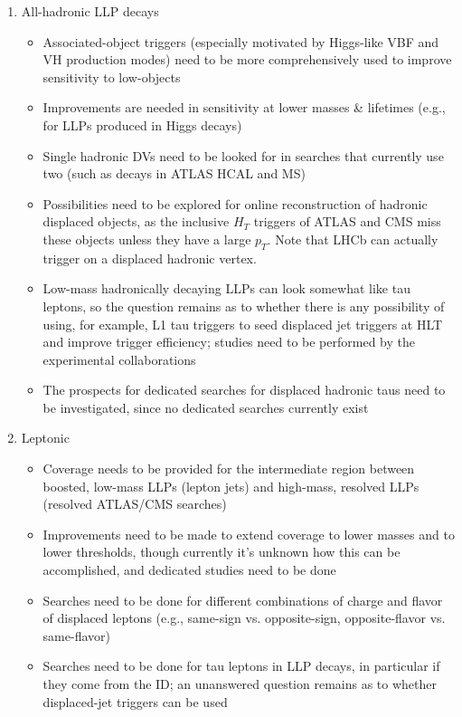 {\begin{enumerate}
\item All-hadronic LLP decays
	\begin{itemize}
	\item Associated-object triggers (especially motivated by Higgs-like VBF and VH production modes) need to be more comprehensively used to improve sensitivity to low-\pT objects
	\item Improvements are needed in sensitivity at lower masses \& lifetimes (e.g., for LLPs produced in Higgs decays)
	\item Single hadronic DVs need to be looked for in searches that currently use two (such as decays in ATLAS HCAL and MS)
	\item Possibilities need to be explored for online reconstruction of hadronic displaced objects, as the inclusive $H_T$ triggers of ATLAS and CMS miss these objects unless they have a large $p_T$. Note that LHCb can actually trigger on a displaced hadronic vertex.
	\item Low-mass hadronically decaying LLPs can look somewhat like tau leptons, so the question remains as to whether there is any possibility of using, for example, L1 tau triggers to seed displaced jet triggers at HLT and improve trigger efficiency; studies need to be performed by the experimental collaborations
	\item The prospects for dedicated searches for displaced hadronic taus need to be investigated, since no dedicated searches currently exist
	\end{itemize}

\item Leptonic
	\begin{itemize}
	\item Coverage needs to be provided for the intermediate region between boosted, low-mass LLPs (lepton jets) and high-mass, resolved LLPs (resolved ATLAS/CMS searches)
	\item Improvements need to be made to extend coverage to lower masses and to lower \pT thresholds, though currently it's unknown how this can be accomplished, and dedicated studies need to be done
	\item Searches need to be done for different combinations of charge and flavor of displaced leptons (e.g., same-sign vs. opposite-sign, opposite-flavor vs. same-flavor)
	\item Searches need to be done for tau leptons in LLP decays, in particular if they come from the ID; an unanswered question remains as to whether displaced-jet triggers can be used
	\end{itemize}


\end{enumerate}}
